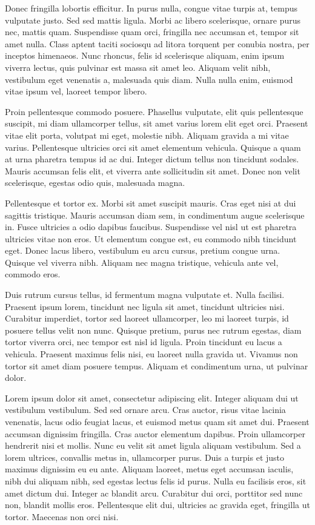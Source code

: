 Donec fringilla lobortis efficitur. In purus nulla, congue vitae turpis at, tempus vulputate justo. Sed sed mattis ligula. Morbi ac libero scelerisque, ornare purus nec, mattis quam. Suspendisse quam orci, fringilla nec accumsan et, tempor sit amet nulla. Class aptent taciti sociosqu ad litora torquent per conubia nostra, per inceptos himenaeos. Nunc rhoncus, felis id scelerisque aliquam, enim ipsum viverra lectus, quis pulvinar est massa sit amet leo. Aliquam velit nibh, vestibulum eget venenatis a, malesuada quis diam. Nulla nulla enim, euismod vitae ipsum vel, laoreet tempor libero.

Proin pellentesque commodo posuere. Phasellus vulputate, elit quis pellentesque suscipit, mi diam ullamcorper tellus, sit amet varius lorem elit eget orci. Praesent vitae elit porta, volutpat mi eget, molestie nibh. Aliquam gravida a mi vitae varius. Pellentesque ultricies orci sit amet elementum vehicula. Quisque a quam at urna pharetra tempus id ac dui. Integer dictum tellus non tincidunt sodales. Mauris accumsan felis elit, et viverra ante sollicitudin sit amet. Donec non velit scelerisque, egestas odio quis, malesuada magna.

Pellentesque et tortor ex. Morbi sit amet suscipit mauris. Cras eget nisi at dui sagittis tristique. Mauris accumsan diam sem, in condimentum augue scelerisque in. Fusce ultricies a odio dapibus faucibus. Suspendisse vel nisl ut est pharetra ultricies vitae non eros. Ut elementum congue est, eu commodo nibh tincidunt eget. Donec lacus libero, vestibulum eu arcu cursus, pretium congue urna. Quisque vel viverra nibh. Aliquam nec magna tristique, vehicula ante vel, commodo eros.

Duis rutrum cursus tellus, id fermentum magna vulputate et. Nulla facilisi. Praesent ipsum lorem, tincidunt nec ligula sit amet, tincidunt ultricies nisi. Curabitur imperdiet, tortor sed laoreet ullamcorper, leo mi laoreet turpis, id posuere tellus velit non nunc. Quisque pretium, purus nec rutrum egestas, diam tortor viverra orci, nec tempor est nisl id ligula. Proin tincidunt eu lacus a vehicula. Praesent maximus felis nisi, eu laoreet nulla gravida ut. Vivamus non tortor sit amet diam posuere tempus. Aliquam et condimentum urna, ut pulvinar dolor.

Lorem ipsum dolor sit amet, consectetur adipiscing elit. Integer aliquam dui ut vestibulum vestibulum. Sed sed ornare arcu. Cras auctor, risus vitae lacinia venenatis, lacus odio feugiat lacus, et euismod metus quam sit amet dui. Praesent accumsan dignissim fringilla. Cras auctor elementum dapibus. Proin ullamcorper hendrerit nisi et mollis. Nunc eu velit sit amet ligula aliquam vestibulum. Sed a lorem ultrices, convallis metus in, ullamcorper purus. Duis a turpis et justo maximus dignissim eu eu ante. Aliquam laoreet, metus eget accumsan iaculis, nibh dui aliquam nibh, sed egestas lectus felis id purus. Nulla eu facilisis eros, sit amet dictum dui. Integer ac blandit arcu. Curabitur dui orci, porttitor sed nunc non, blandit mollis eros. Pellentesque elit dui, ultricies ac gravida eget, fringilla ut tortor. Maecenas non orci nisi.

